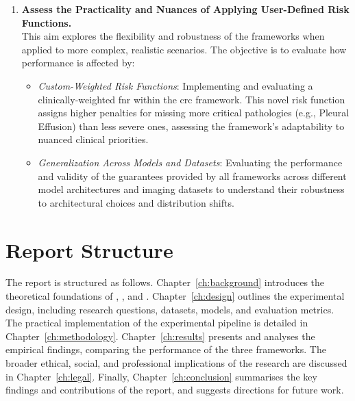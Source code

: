 \begin{enumerate}
    \item \textbf{Assess the Practicality and Nuances of Applying User-Defined Risk Functions.} \\
    This aim explores the flexibility and robustness of the frameworks
    when applied to more complex, realistic scenarios.
    The objective is to evaluate how performance is affected by:
    \begin{itemize}
        \item \emph{Custom-Weighted Risk Functions}:
        Implementing and evaluating a clinically-weighted \gls{fnr} within the \gls{crc} framework.
        This novel risk function assigns higher penalties for missing more critical pathologies
        (e.g., Pleural Effusion) than less severe ones,
        assessing the framework's adaptability to nuanced clinical priorities.
        \item \emph{Generalization Across Models and Datasets}:
        Evaluating the performance and validity of the guarantees provided by all frameworks
        across different model architectures and imaging datasets
        to understand their robustness to architectural choices and distribution shifts.
    \end{itemize}
\end{enumerate}

\section{Report Structure}

The report is structured as follows. Chapter~\ref{ch:background} introduces
the theoretical foundations of , , and .
Chapter~\ref{ch:design} outlines the experimental design, including research questions,
datasets, models, and evaluation metrics.
The practical implementation of the experimental pipeline is detailed in Chapter~\ref{ch:methodology}.
Chapter~\ref{ch:results} presents and analyses the empirical findings,
comparing the performance of the three frameworks. The broader ethical, social, and professional
implications of the research are discussed in Chapter~\ref{ch:legal}.
Finally, Chapter~\ref{ch:conclusion} summarises the key findings and contributions of the report,
and suggests directions for future work.
